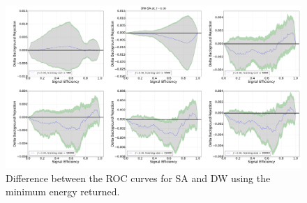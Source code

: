 \documentclass[fleqn,10pt]{wlscirep}
\begin{document}
\begin{figure}[h]
\centering
\includegraphics[width=0.8\paperwidth]{DW--SA_GS}
\caption{Difference between the ROC curves for SA and DW using the minimum energy returned.}
\label{fig:SA_DW_GS_droc}
\end{figure}
\end{document}
